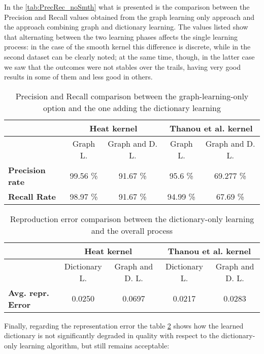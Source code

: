 In the \autoref{tab:PrecRec_noSmth} what is presented is the comparison between the Precision and Recall values obtained from the graph learning only approach and the approach combining graph and dictionary learning. The values listed show that alternating between the two learning phases affects the single learning process: in the case of the smooth kernel this difference is discrete, while in the second dataset can be clearly noted; at the same time, though, in the latter case we saw that the outcomes were not stables over the trails, having very good results in some of them and less good in others.

\begin{table}[htbp]
  \centering
  \begin{tabular}{lcccc}
  &\multicolumn{2}{c}{\textbf{Heat kernel}}&\multicolumn{2}{c}{\textbf{Thanou et al. kernel}}\\
  \toprule
  &Graph L. & Graph and D. L. & Graph L. & Graph and D. L.\\ %
    \midrule
    \textbf{Precision rate} & 99.56 \% & 91.67 \% & 95.6 \% & 69.277 \%\\
    \textbf{Recall Rate} & 98.97 \% &  91.67 \% & 94.99 \% & 67.69 \%\\
    \bottomrule
  \end{tabular}
  \caption{Precision and Recall comparison between the graph-learning-only option and the one adding the dictionary learning}
  \label{tab:PrecRec_noSmth}
\end{table}

\begin{table}[h]
  \centering
  \begin{tabular}{lcccc}
  &\multicolumn{2}{c}{\textbf{Heat kernel}}&\multicolumn{2}{c}{\textbf{Thanou et al. kernel}}\\
  \toprule
  &Dictionary L. & Graph and D. L. & Dictionary L. & Graph and D. L.\\ %
    \midrule
    \textbf{Avg. repr. Error} & 0.0250 & 0.0697 & 0.0217 & 0.0283\\
    \bottomrule
  \end{tabular}
  \caption{Reproduction error comparison between the dictionary-only learning and the overall process}
  \label{tab:errorGD}
\end{table}

Finally, regarding the representation error the table \ref{tab:errorGD} shows how the learned dictionary is not significantly degraded in quality with respect to the dictionary-only learning algorithm, but still remains acceptable:
